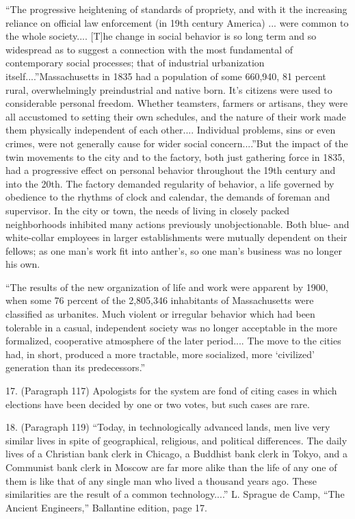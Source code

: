 “The progressive heightening of standards of propriety, and with it the increasing reliance on official law enforcement (in 19th century America) ... were common to the whole society.... [T]he change in social behavior is so long term and so widespread as to suggest a connection with the most fundamental of contemporary social processes; that of industrial urbanization itself....”Massachusetts in 1835 had a population of some 660,940, 81 percent rural, overwhelmingly preindustrial and native born. It’s citizens were used to considerable personal freedom. Whether teamsters, farmers or artisans, they were all accustomed to setting their own schedules, and the nature of their work made them physically independent of each other.... Individual problems, sins or even crimes, were not generally cause for wider social concern....”But the impact of the twin movements to the city and to the factory, both just gathering force in 1835, had a progressive effect on personal behavior throughout the 19th century and into the 20th. The factory demanded regularity of behavior, a life governed by obedience to the rhythms of clock and calendar, the demands of foreman and supervisor. In the city or town, the needs of living in closely packed neighborhoods inhibited many actions previously unobjectionable. Both blue- and white-collar employees in larger establishments were mutually dependent on their fellows; as one man’s work fit into anther’s, so one man’s business was no longer his own.

“The results of the new organization of life and work were apparent by 1900, when some 76 percent of the 2,805,346 inhabitants of Massachusetts were classified as urbanites. Much violent or irregular behavior which had been tolerable in a casual, independent society was no longer acceptable in the more formalized, cooperative atmosphere of the later period.... The move to the cities had, in short, produced a more tractable, more socialized, more ‘civilized’ generation than its predecessors.”

17. (Paragraph 117) Apologists for the system are fond of citing cases in which elections have been decided by one or two votes, but such cases are rare.

18. (Paragraph 119) “Today, in technologically advanced lands, men live very similar lives in spite of geographical, religious, and political differences. The daily lives of a Christian bank clerk in Chicago, a Buddhist bank clerk in Tokyo, and a Communist bank clerk in Moscow are far more alike than the life of any one of them is like that of any single man who lived a thousand years ago. These similarities are the result of a common technology....” L. Sprague de Camp, “The Ancient Engineers,” Ballantine edition, page 17.

